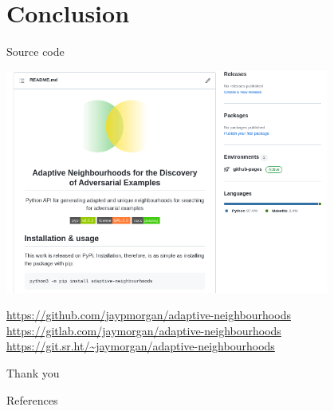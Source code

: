 \documentclass[smaller]{beamer}
\begin{document}
\section{Conclusion}
\label{sec:orgd4f3648}

\begin{frame}[label={sec:org9f2a74b}]{Source code}
\begin{center}
\includegraphics[width=0.8\textwidth]{images/github-repo.png}
\end{center}

\url{https://github.com/jaypmorgan/adaptive-neighbourhoods}
\url{https://gitlab.com/jaymorgan/adaptive-neighbourhoods}
\url{https://git.sr.ht/\~jaymorgan/adaptive-neighbourhoods}
\end{frame}

\begin{frame}[label={sec:org4d3ed2b}]{Thank you}
\end{frame}

\begin{frame}[label={sec:org2575cc4}]{References}
\end{frame}
\end{document}
